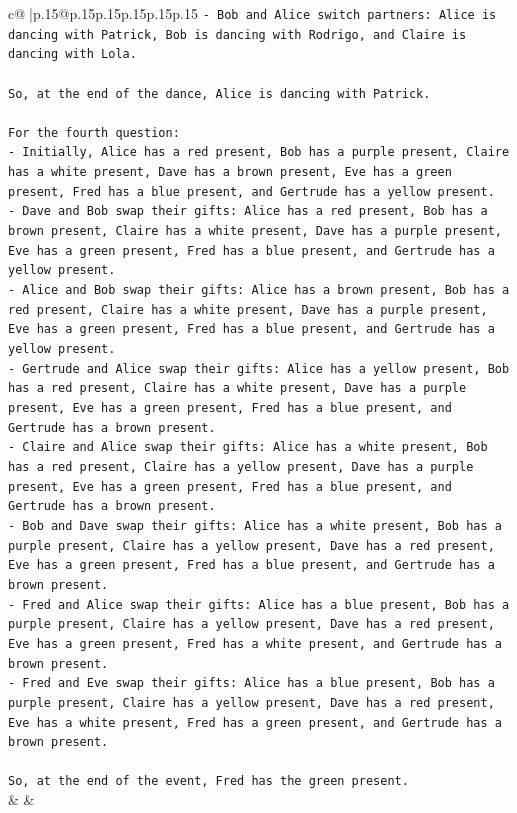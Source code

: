 \documentclass{article}
\begin{document}
{\begin{supertabular}{c@{$\;$}|p{.15\linewidth}@{}p{.15\linewidth}p{.15\linewidth}p{.15\linewidth}p{.15\linewidth}p{.15\linewidth}}
{{{\texttt{{-} Bob and Alice switch partners: Alice is dancing with Patrick, Bob is dancing with Rodrigo, and Claire is dancing with Lola.} \\
\\ 
\texttt{So, at the end of the dance, Alice is dancing with Patrick.} \\
\\ 
\texttt{For the fourth question:} \\
\texttt{{-} Initially, Alice has a red present, Bob has a purple present, Claire has a white present, Dave has a brown present, Eve has a green present, Fred has a blue present, and Gertrude has a yellow present.} \\
\texttt{{-} Dave and Bob swap their gifts: Alice has a red present, Bob has a brown present, Claire has a white present, Dave has a purple present, Eve has a green present, Fred has a blue present, and Gertrude has a yellow present.} \\
\texttt{{-} Alice and Bob swap their gifts: Alice has a brown present, Bob has a red present, Claire has a white present, Dave has a purple present, Eve has a green present, Fred has a blue present, and Gertrude has a yellow present.} \\
\texttt{{-} Gertrude and Alice swap their gifts: Alice has a yellow present, Bob has a red present, Claire has a white present, Dave has a purple present, Eve has a green present, Fred has a blue present, and Gertrude has a brown present.} \\
\texttt{{-} Claire and Alice swap their gifts: Alice has a white present, Bob has a red present, Claire has a yellow present, Dave has a purple present, Eve has a green present, Fred has a blue present, and Gertrude has a brown present.} \\
\texttt{{-} Bob and Dave swap their gifts: Alice has a white present, Bob has a purple present, Claire has a yellow present, Dave has a red present, Eve has a green present, Fred has a blue present, and Gertrude has a brown present.} \\
\texttt{{-} Fred and Alice swap their gifts: Alice has a blue present, Bob has a purple present, Claire has a yellow present, Dave has a red present, Eve has a green present, Fred has a white present, and Gertrude has a brown present.} \\
\texttt{{-} Fred and Eve swap their gifts: Alice has a blue present, Bob has a purple present, Claire has a yellow present, Dave has a red present, Eve has a white present, Fred has a green present, and Gertrude has a brown present.} \\
\\ 
\texttt{So, at the end of the event, Fred has the green present.} \\
            }
        }
    }
    & & \\ \\


\end{supertabular}}
\end{document}
